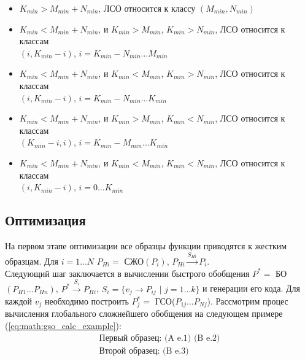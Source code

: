 \documentclass[12pt]{article}
\begin{document}
\begin{itemize}
\item $K_{min} > M_{min} + N_{min}$, ЛСО относится к классу $(M_{min}, N_{min})$
\item $K_{min} < M_{min} + N_{min}$, и $K_{min} > M_{min}$, $K_{min} > N_{min}$, ЛСО относится к классам\\ \indent$(i, K_{min} - i)$, $i = K_{min} - N_{min} \ldots M_{min}$ 
\item $K_{min} < M_{min} + N_{min}$, и $K_{min} < M_{min}$, $K_{min} > N_{min}$, ЛСО относится к классам\\ \indent$(i, K_{min} - i)$, $i = K_{min} - N_{min} \ldots K_{min}$ 
\item $K_{min} < M_{min} + N_{min}$, и $K_{min} > M_{min}$, $K_{min} < N_{min}$, ЛСО относится к классам\\ \indent$(K_{min} - i, i)$, $i = K_{min} - M_{min} \ldots K_{min}$
\item $K_{min} < M_{min} + N_{min}$, и $K_{min} < M_{min}$, $K_{min} < N_{min}$, ЛСО относится к классам\\ \indent$(i, K_{min} - i)$, $i = 0 \ldots K_{min}$
\end{itemize}
 

\subsection[Оптимизация]{\large Оптимизация} \label{sec:optimization}
\hspace{\parindent} На первом этапе оптимизации все образцы функции приводятся к жестким образцам. Для $i = 1 \ldots N$ $P_{Hi} = $ СЖО$(P_i)$, $P_{Hi} \xrightarrow{S_{Hi}} P_i$.\\
\indent Следующий шаг заключается в вычислении быстрого обобщения $P^{*} = $ БО$(P_{H1} \ldots P_{Hn})$, $P^{*} \xrightarrow{S_i} P_{Hi}$, $S_i = \{v_j \to P_{ij}$ $|$ $j = 1\ldots k \}$ и генерации его кода. Для каждой $v_j$ необходимо построить $P_j^* = $ ГСО($P_{1j} \ldots P_{Nj}$). Рассмотрим процес вычисления глобального сложнейшего обобщения на следующем примере (\ref{eq:math:gso_calc_example}):
\begin{equation}\label{eq:math:gso_calc_example}
\begin{array}{l}
\textrm{Первый образец: (A e.1) (B e.2)} \\
\textrm{Второй образец: (B e.3)} \\
\end{array}
\end{equation} 
\end{document}
